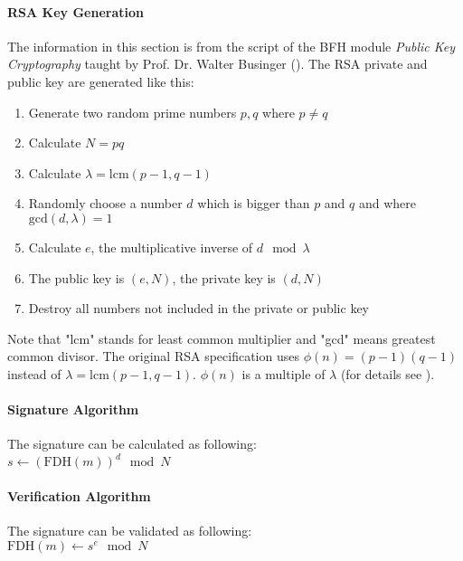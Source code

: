\paragraph{RSA Key Generation}
\label{sec:rsa-keygen}
The information in this section is from the script of the BFH module \textit{Public Key Cryptography} taught by Prof. Dr. Walter Businger (\cite{businger:public-key-crytpo}).
The RSA private and public key are generated like this:
\begin{enumerate}
    \item Generate two random prime numbers $ p, q $ where $ p \neq q $
    \item Calculate $ N = pq $
    \item Calculate $ \lambda = \text{lcm}(p-1, q-1) $
    \item Randomly choose a number $ d $ which is bigger than $ p $ and $ q $ and where $ \text{gcd}(d, \lambda) = 1 $
    \item Calculate $ e $, the multiplicative inverse of $ d \mod \lambda $
    \item The public key is $ (e, N) $, the private key is $ (d, N) $
    \item Destroy all numbers not included in the private or public key
\end{enumerate}
Note that "lcm" stands for least common multiplier and "gcd" means greatest common divisor.
The original RSA specification uses $ \phi(n) = (p-1)(q-1) $ instead of $ \lambda = \text{lcm}(p-1, q-1) $.
$ \phi(n) $ is a multiple of $ \lambda $ (for details see \cite{businger:public-key-crytpo}).

\paragraph{Signature Algorithm}
\label{sec:rsa-fdh-sign}
The signature can be calculated as following:
\\ $ s \gets (\text{FDH}(m))^d \mod N$

\paragraph{Verification Algorithm}
\label{sec:rsa-fdh-verify}
The signature can be validated as following:
\\ $ \text{FDH}(m) \gets s^e \mod N$

